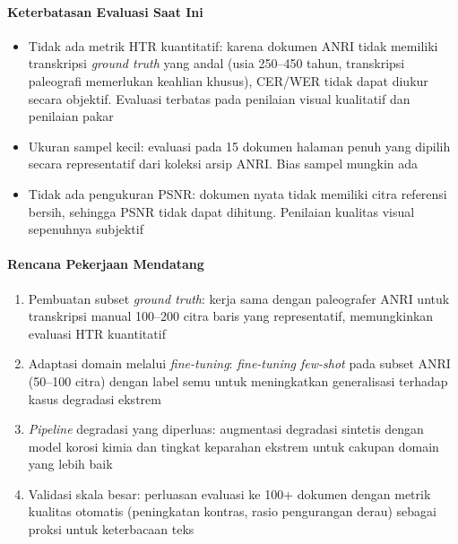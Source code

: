 \documentclass[journal]{IEEEtran}
\begin{document}
\paragraph{Keterbatasan Evaluasi Saat Ini}
\begin{itemize}
    \item Tidak ada metrik HTR kuantitatif: karena dokumen ANRI tidak memiliki transkripsi \textit{ground truth} yang andal (usia 250--450 tahun, transkripsi paleografi memerlukan keahlian khusus), CER/WER tidak dapat diukur secara objektif. Evaluasi terbatas pada penilaian visual kualitatif dan penilaian pakar
    
    \item Ukuran sampel kecil: evaluasi pada 15 dokumen halaman penuh yang dipilih secara representatif dari koleksi arsip ANRI. Bias sampel mungkin ada
    
    \item Tidak ada pengukuran PSNR: dokumen nyata tidak memiliki citra referensi bersih, sehingga PSNR tidak dapat dihitung. Penilaian kualitas visual sepenuhnya subjektif
\end{itemize}

\paragraph{Rencana Pekerjaan Mendatang}
\begin{enumerate}
    \item Pembuatan subset \textit{ground truth}: kerja sama dengan paleografer ANRI untuk transkripsi manual 100--200 citra baris yang representatif, memungkinkan evaluasi HTR kuantitatif
    
    \item Adaptasi domain melalui \textit{fine-tuning}: \textit{fine-tuning few-shot} pada subset ANRI (50--100 citra) dengan label semu untuk meningkatkan generalisasi terhadap kasus degradasi ekstrem
    
    \item \textit{Pipeline} degradasi yang diperluas: augmentasi degradasi sintetis dengan model korosi kimia dan tingkat keparahan ekstrem untuk cakupan domain yang lebih baik
    
    \item Validasi skala besar: perluasan evaluasi ke 100+ dokumen dengan metrik kualitas otomatis (peningkatan kontras, rasio pengurangan derau) sebagai proksi untuk keterbacaan teks
\end{enumerate}
\end{document}
